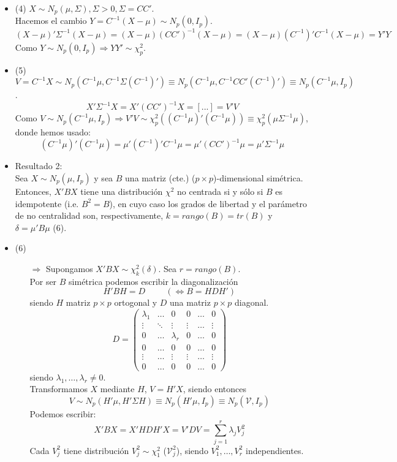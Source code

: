 \documentclass[11pt,a4paper]{article}
\begin{document}
\begin{itemize}
\item (4) $X \sim N_{p}(\mu, \Sigma), \Sigma > 0, \Sigma = CC'$. \\
Hacemos el cambio $Y = C^{-1}(X - \mu) \sim N_{p}(0, I_{p})$.
$$(X-\mu)'\Sigma^{-1}(X-\mu) = (X-\mu)(CC')^{-1}(X-\mu) = (X-\mu)(C^{-1})'C^{-1}(X-\mu) = Y'Y$$
Como $Y \sim N_{p}(0, I_{p}) \Rightarrow YY' \sim \chi^{2}_{p}$.

\item (5) $V = C^{-1}X \sim N_{p}(C^{-1}\mu, C^{-1}\Sigma(C^{-1})') \equiv N_{p}(C^{-1}\mu, C^{-1}CC'(C^{-1})') \equiv N_{p}(C^{-1}\mu, I_{p})$.
$$X'\Sigma^{-1}X = X'(CC')^{-1}X = [...] = V'V$$
Como $V \sim N_{p}(C^{-1}\mu, I_{p}) \Rightarrow V'V \sim \chi_{p}^{2}((C^{-1}\mu)'(C^{-1}\mu)) \equiv \chi_{p}^{2}(\mu\Sigma^{-1}\mu)$, donde hemos usado:
$$(C^{-1}\mu)'(C^{-1}\mu) = \mu'(C^{-1})'C^{-1}\mu = \mu'(CC')^{-1}\mu = \mu'\Sigma^{-1}\mu$$

\item Resultado 2: \\
Sea $X \sim N_{p}(\mu, I_{p})$ y sea $B$ una matriz (cte.) ($p \times p$)-dimensional simétrica. Entonces, $X'BX$ tiene una distribución $\chi^{2}$ no centrada si y sólo si $B$ es idempotente (i.e. $B^{2}=B$), en cuyo caso los grados de libertad y el parámetro de no centralidad son, respectivamente, $k = rango(B) = tr(B)$ y $\delta = \mu'B\mu$ \hspace{1cm} (6).

\item (6) \begin{itemize}
\item[$\Rightarrow$] Supongamos $X'BX \sim \chi^{2}_{k}(\delta)$. Sea $r = rango(B)$. \\
Por ser $B$ simétrica podemos escribir la diagonalización
$$H'BH = D \hspace{1cm} (\iff B = HDH')$$
siendo $H$ matriz $p \times p$ ortogonal y $D$ una matriz $p \times p$ diagonal.
$$D = \begin{pmatrix}
\lambda_{1} & \dots & 0 & 0 & \dots & 0 \\
\vdots & \ddots & \vdots & \vdots & \dots & \vdots \\
0 & \dots & \lambda_{r} & 0 & \dots & 0 \\
0 & \dots & 0 & 0 & \dots & 0 \\
\vdots & \dots & \vdots & \vdots & \dots & \vdots \\
0 & \dots & 0 & 0 & \dots & 0
\end{pmatrix}$$
siendo $\lambda_{1}, \dots, \lambda_{r} \neq 0$. \\
Transformamos $X$ mediante $H$, $V = H'X$, siendo entonces
$$V \sim N_{p} (H'\mu, H' \Sigma H) \equiv N_{p}(H'\mu, I_{p}) \equiv N_{p}(\mathcal{V}, I_{p})$$
Podemos escribir:
$$X'BX = X'HDH'X = V'DV = \sum_{j=1}^{r} \lambda_{j} V_{j}^{2}$$
Cada $V_{j}^{2}$ tiene distribución $V_{j}^{2} \sim \chi_{1}^{2}$ ($\mathcal{V}_{j}^{2}$), siendo $V_{1}^{2}, \dots, V_{r}^{2}$ independientes.


\end{itemize}
\end{itemize}
\end{document}
